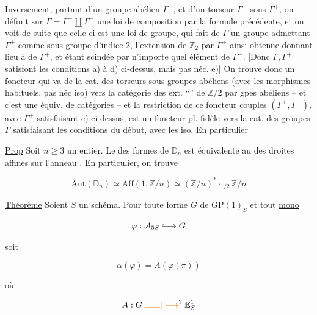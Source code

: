 Inversement, partant d'un groupe abélien $\Gamma^+$,
et d'un torseur $\Gamma^-$ sous $\Gamma^+$, on définit sur
$\Gamma=\Gamma^+\amalg\Gamma^-$ une  loi de composition
par la formule précédente, et on voit de
suite que celle-ci est une loi de groupe, qui
fait de $\Gamma$ un groupe admettant $\Gamma^+$ comme
sous-groupe  d'indice 2, l'extension de $\mathbb Z_2$ par
$\Gamma^+$ ainsi obtenue donnant lieu à  
de $\Gamma^+$, et étant scindée par n'importe quel élément
de $\Gamma^-$. [Donc $\Gamma,\Gamma^+$ satisfont les conditions a) à d)
ci-dessus, mais pas néc. e)] On trouve
donc un foncteur qui va de la cat. des
 torseurs sous groupes abéliens (avec les
morphismes habituels, pas néc iso) vers la catégorie
des ext. ``'' de $\mathbb Z/2$ par gpes abéliens
-- et c'est une équiv. de catégories -- et la
restriction de ce foncteur   couples
$(\Gamma^+,\Gamma^-)$, avec $\Gamma^+$ satisfaisant e) ci-dessus,  est un
foncteur pl. fidèle vers la cat. des
groupes $\Gamma$ satisfaisant les conditions du début,
avec les iso. En particulier

\uline{Prop} Soit $n\geq3$ un entier. Le  des formes de
$\mathbb D_n$ est équivalente au  des droites
affines sur l'anneau . En particulier, on
trouve

\[
\mathrm{Aut}(\mathbb D_n)\simeq\mathrm{Aff}(1,\mathbb Z/n)\simeq(\mathbb Z/n)^*\mathbin{\cdot_{1/2}}\mathbb Z/n
\]

\uline{Théorème} Soient $S$ un schéma. Pour toute forme $G$ de
$\mathrm{GP}(1)_S$ et tout \uline{mono}

\[
\varphi:\mathcal A_{5S}\lhook\joinrel\longrightarrow G
\]


soit

\[
\alpha(\varphi)=A(\varphi(\pi))
\]

où

\[
A:G\mathrel{\unsure{\rule{1.8em}{.4pt}|\longrightarrow}}\mathbb E^1_S
\]

